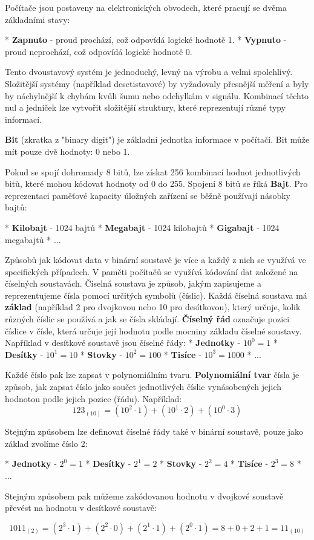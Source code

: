 Počítače jsou postaveny na elektronických obvodech, které pracují se dvěma základními stavy:

\begitems
* {\bf Zapnuto} - proud prochází, což odpovídá logické hodnotě 1.
* {\bf Vypnuto} - proud neprochází, což odpovídá logické hodnotě 0.
\enditems

Tento dvoustavový systém je jednoduchý, levný na výrobu a velmi spolehlivý. Složitější systémy (například desetistavové) by vyžadovaly přesnější měření a byly by náchylnější k chybám kvůli šumu nebo odchylkám v signálu. Kombinací těchto nul a jedniček lze vytvořit složitější struktury, které reprezentují různé typy informací. 

{\bf Bit} (zkratka z "binary digit") je základní jednotka informace v počítači. Bit může mít pouze dvě hodnoty: 0 nebo 1. 

Pokud se spojí dohromady 8 bitů, lze získat 256 kombinací hodnot jednotlivých bitů, které mohou kódovat hodnoty od 0 do 255. Spojení 8 bitů se říká {\bf Bajt}. Pro reprezentaci paměťové kapacity úložných zařízení se běžně používají násobky bajtů:

\begitems
* {\bf Kilobajt} - 1024 bajtů
* {\bf Megabajt} - 1024 kilobajtů
* {\bf Gigabajt} - 1024 megabajtů
* ...
\enditems

Způsobů jak kódovat data v binární soustavě je více a každý z nich se využívá ve specifických případech. V paměti počítačů se využívá kódování dat založené na číselných soustavách. Číselná soustava je způsob, jakým zapisujeme a reprezentujeme čísla pomocí určitých symbolů (číslic). Každá číselná soustava má {\bf základ} (například 2 pro dvojkovou nebo 10 pro desítkovou), který určuje, kolik různých číslic se používá a jak se čísla skládají. {\bf Číselný řád} označuje pozici číslice v čísle, která určuje její hodnotu podle mocniny základu číselné soustavy. Například v desítkové soustavě jsou číselné řády:
\begitems 
* {\bf Jednotky} - $10^0 = 1$
* {\bf Desítky} - $10^1 = 10$
* {\bf Stovky} - $10^2 = 100$
* {\bf Tisíce} - $10^3 = 1000$
* ...
\enditems

Každé číslo pak lze zapsat v polynomiálním tvaru. {\bf Polynomiální tvar} čísla je způsob, jak zapsat číslo jako součet jednotlivých číslic vynásobených jejich hodnotou podle jejich pozice (řádu). Například:
$$
123_{(10)} = (10^2 \cdot 1) + (10^1 \cdot 2) + (10^0 \cdot 3)
$$

Stejným způsobem lze definovat číselné řády také v binární soustavě, pouze jako základ zvolíme číslo 2:

\begitems 
* {\bf Jednotky} - $2^0 = 1$
* {\bf Desítky} - $2^1 = 2$
* {\bf Stovky} - $2^2 = 4$
* {\bf Tisíce} - $2^3 = 8$
* ...
\enditems

Stejným způsobem pak můžeme zakódovanou hodnotu v dvojkové soustavě převést na hodnotu v desítkové soustavě:

$$
1011_{(2)} = (2^3 \cdot 1) + (2^2 \cdot 0) + (2^1 \cdot 1) + (2^0 \cdot 1) = 8 + 0 + 2 + 1 = 11_{(10)}
$$


